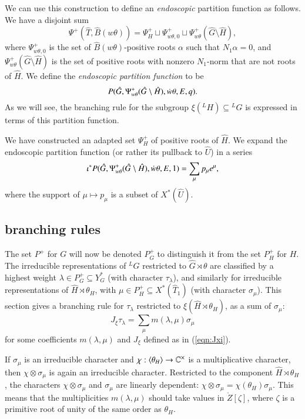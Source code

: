 We can use this construction to define an {\it endoscopic} partition
function as follows.  We have a disjoint sum
\begin{equation}\label{eqn:disj-b1}
\Psi^+(\hat T,\hat B(w\theta)) = 
\Psi^+_H \sqcup \Psi_{w\theta,0}^+ 
\sqcup \Psi_{w\theta}^+(\hat G\setminus\hat H),
\end{equation}
where $\Psi_{w\theta,0}^+$ is the set of $\hat B(w\theta)$-positive
roots $\alpha$ such that $N_1\alpha=0$, and $\Psi_{w\theta}^+(\hat
G\setminus\hat H)$ is the set of positive roots with nonzero
$N_1$-norm that are not roots of $\hat H$.  We define the {\it
  endoscopic partition function} to be
\begin{equation}\label{eqn:endo-partition}
P(\hat G,\Psi_{w\theta}^+(\hat G\setminus\hat H),\dot w\theta,E,q).
\end{equation}
As we will see, the branching rule for the subgroup
$\xi({}^LH)\subseteq {}^LG$ is expressed in terms of this partition
function.

We have constructed an adapted set $\Psi^+_H$ of positive roots of
$\hat H$.  We expand the endoscopic partition function (or rather its
pullback to $\hat U$) in a series
\begin{equation}
\iota^* P(\hat G,\Psi_{w\theta}^+
(\hat G\setminus\hat H),\dot w\theta,E,1) = \sum_{\mu} p_\mu e^\mu,
\end{equation}
where the support of $\mu\mapsto p_\mu$ is a subset of $X^*(\hat U)$.

\subsection{branching rules}

The set $P^+$ for $G$ will now be denoted $P^+_G$ to distinguish
it from the set $P^+_H$ for $H$.
The irreducible representations of ${}^LG$ restricted to $\hat
G\rtimes\theta$ are classified by a highest weight $\lambda\in
P^+_G\subseteq Y^*_G$ (with character $\tau_\lambda$), and similarly
for irreducible representations of $\hat H\rtimes \theta_H$, with
$\mu\in P^+_H\subseteq X^*(\hat T_1)$ (with character $\sigma_\mu$).
This section gives a branching rule for $\tau_\lambda$ restricted to
$\xi(\hat H\rtimes\theta_H)$, as a sum of $\sigma_\mu$:
\[
J_\xi\tau_\lambda = \sum_\mu m(\lambda,\mu) \sigma_\mu
\]
for some coefficients $m(\lambda,\mu)$ and $J_\xi$ defined as in
(\ref{eqn:Jxi}).

If $\sigma_\mu$ is an irreducible character and
$\chi:\langle{\theta_H}\rangle\to \mathbb{C}^\times$ is a multiplicative
character, then $ \chi\otimes\sigma_\mu$ is again an irreducible
character.  Restricted to the component $\hat H\rtimes\theta_H$, the
characters $\chi\otimes\sigma_\mu$ and $\sigma_\mu$ are linearly
dependent: $\chi\otimes\sigma_\mu = \chi(\theta_H) \sigma_\mu $.  This
means that the multiplicities $m(\lambda,\mu)$ should take values in
$\ring{Z}[\zeta]$, where $\zeta$ is a primitive root of unity of the
same order as $\theta_H$.

